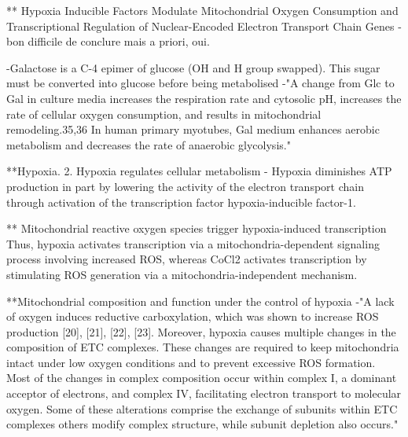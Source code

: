 \documentclass[11pt,a4paper]{article}
\begin{document}
** Hypoxia Inducible Factors Modulate Mitochondrial Oxygen Consumption and Transcriptional Regulation of Nuclear-Encoded Electron Transport Chain Genes
-bon difficile de conclure mais a priori, oui.

-Galactose is a C-4 epimer of glucose (OH and H group swapped). This sugar must be converted into glucose before being metabolised
-"A change from Glc to Gal in culture media increases the respiration rate and cytosolic pH, increases the rate of cellular oxygen consumption, and results in mitochondrial remodeling.35,36 In human primary myotubes, Gal medium enhances aerobic metabolism and decreases the rate of anaerobic glycolysis."


**Hypoxia. 2. Hypoxia regulates cellular metabolism
-  Hypoxia diminishes ATP production in part by lowering the activity of the electron transport chain through activation of the transcription factor hypoxia-inducible factor-1.


** Mitochondrial reactive oxygen species trigger hypoxia-induced transcription
Thus, hypoxia activates transcription via a mitochondria-dependent signaling process involving increased ROS, whereas CoCl2 activates transcription by stimulating ROS generation via a mitochondria-independent mechanism.

**Mitochondrial composition and function under the control of hypoxia
-"A lack of oxygen induces reductive carboxylation, which was shown to increase ROS production [20], [21], [22], [23]. Moreover, hypoxia causes multiple changes in the composition of ETC complexes. These changes are required to keep mitochondria intact under low oxygen conditions and to prevent excessive ROS formation. Most of the changes in complex composition occur within complex I, a dominant acceptor of electrons, and complex IV, facilitating electron transport to molecular oxygen. Some of these alterations comprise the exchange of subunits within ETC complexes others modify complex structure, while subunit depletion also occurs."
\end{document}
